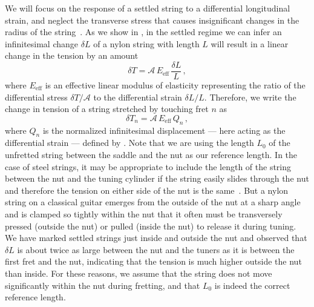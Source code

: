 We will focus on the response of a settled string to a differential longitudinal strain, and neglect the transverse stress that causes insignificant changes in the radius of the string~\cite{ref:lynchaird2017mpn}. As we show in , in the settled regime we can infer an infinitesimal change $\delta L$ of a nylon string with length $L$ will result in a linear change in the tension by an amount~\cite{ref:landau1986toe}
\begin{equation} \label{eqn:youngs_mod_def}
  \delta T = \mathcal{A}\, E_\mathrm{eff}\, \frac{\delta L}{L}\, ,
\end{equation}
where $E_\mathrm{eff}$ is an effective linear modulus of elasticity representing the ratio of the differential stress $\delta T / \mathcal{A}$ to the differential strain $\delta L / L$. Therefore, we write the change in tension of a string stretched by touching fret $n$ as
 \begin{equation} \label{eqn:delta_t_n}
\delta T_n = \mathcal{A}\, E_\mathrm{eff}\, Q_n\, ,
 \end{equation}
where $Q_n$ is the normalized infinitesimal displacement --- here acting as the differential strain --- defined by . Note that we are using the length $L_0$ of the unfretted string between the saddle and the nut as our reference length. In the case of steel strings, it may be appropriate to include the length of the string between the nut and the tuning cylinder if the string easily slides through the nut and therefore the tension on either side of the nut is the same~\cite{ref:kemp2020ibg}. But a nylon string on a classical guitar emerges from the outside of the nut at a sharp angle and is clamped so tightly within the nut that it often must be transversely pressed (outside the nut) or pulled (inside the nut) to release it during tuning. We have marked settled strings just inside and outside the nut and observed that $\delta L$ is about twice as large between the nut and the tuners as it is between the first fret and the nut, indicating that the tension is much higher outside the nut than inside. For these reasons, we assume that the string does not move significantly within the nut during fretting, and that $L_0$ is indeed the correct reference length. 

